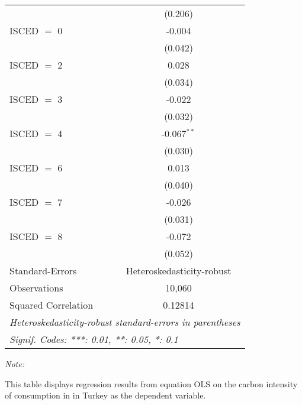 \begin{table}[htbp!]
\begin{adjustbox}{width = 1\textwidth, max height = 0.95\textheight, center}
\begin{threeparttable}[b]
\begin{tabular}{lc}
                                & (0.206)\\   
            ISCED $=$ 0         & -0.004\\   
                                & (0.042)\\   
            ISCED $=$ 2         & 0.028\\   
                                & (0.034)\\   
            ISCED $=$ 3         & -0.022\\   
                                & (0.032)\\   
            ISCED $=$ 4         & -0.067$^{**}$\\   
                                & (0.030)\\   
            ISCED $=$ 6         & 0.013\\   
                                & (0.040)\\   
            ISCED $=$ 7         & -0.026\\   
                                & (0.031)\\   
            ISCED $=$ 8         & -0.072\\   
                                & (0.052)\\   
            \midrule 
            Standard-Errors     & Heteroskedasticity-robust \\   
            Observations        & 10,060\\  
            Squared Correlation & 0.12814\\  
            \midrule \midrule
            \multicolumn{2}{l}{\emph{Heteroskedasticity-robust standard-errors in parentheses}}\\
            \multicolumn{2}{l}{\emph{Signif. Codes: ***: 0.01, **: 0.05, *: 0.1}}\\
         \end{tabular}
         
         \begin{tablenotes}\item \medskip \textit{Note:}
            \item This table displays regression results from equation OLS on the carbon intensity of consumption in  in Turkey as the dependent variable. 
         \end{tablenotes}
      \end{threeparttable}
   \end{adjustbox}
\end{table}


